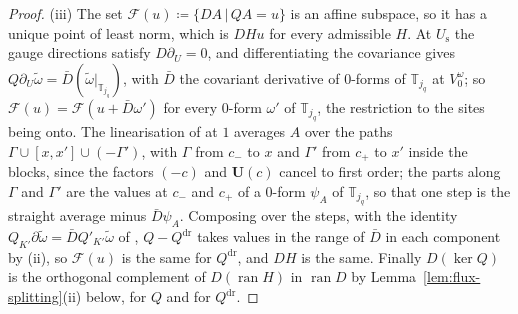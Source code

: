 \documentclass[11pt]{preprint}
\numberwithin{equation}{section}
\theoremstyle{definition}
\theoremstyle{remark}
\theoremstyle{plain}
\begin{document}
\begin{proof}
(iii) The set $\mathcal F(u) \coloneqq \{ DA \,|\, QA = u \}$ is an affine subspace, so it has a unique point of least norm, which is $DHu$ for every admissible $H$. At $U_{\mathrm s}$ the gauge directions satisfy $D\partial_U = 0$, and differentiating the covariance \cite[(0.6), p.~253]{BalabanRG1} gives $Q\partial_U\tilde\omega = \bar D(\tilde\omega|_{\mathbb T_{j_q}})$, with $\bar D$ the covariant derivative of $0$-forms of $\mathbb T_{j_q}$ at $V_0^\omega$; so $\mathcal F(u) = \mathcal F(u + \bar D\omega')$ for every $0$-form $\omega'$ of $\mathbb T_{j_q}$, the restriction to the sites being onto. The linearisation of \cite[(0.4)]{BalabanRG1} at $1$ averages $A$ over the paths $\Gamma \cup [x, x'] \cup (-\Gamma')$, with $\Gamma$ from $c_-$ to $x$ and $\Gamma'$ from $c_+$ to $x'$ inside the blocks, since the factors $(-c)$ and $\mathbf U(c)$ cancel to first order; the parts along $\Gamma$ and $\Gamma'$ are the values at $c_-$ and $c_+$ of a $0$-form $\psi_A$ of $\mathbb T_{j_q}$, so that one step is the straight average minus $\bar D\psi_A$. Composing over the steps, with the identity $Q_{K'}\partial\tilde\omega = \bar DQ'_{K'}\tilde\omega$ of \cite[(1.20), p.~20]{BalabanPRT1}, $Q - Q^{\mathrm{dr}}$ takes values in the range of $\bar D$ in each component by (ii), so $\mathcal F(u)$ is the same for $Q^{\mathrm{dr}}$, and $DH$ is the same. Finally $D(\ker Q)$ is the orthogonal complement of $D(\operatorname{ran}H)$ in $\operatorname{ran}D$ by Lemma~\ref{lem:flux-splitting}(ii) below, for $Q$ and for $Q^{\mathrm{dr}}$.


\end{proof}
\end{document}
